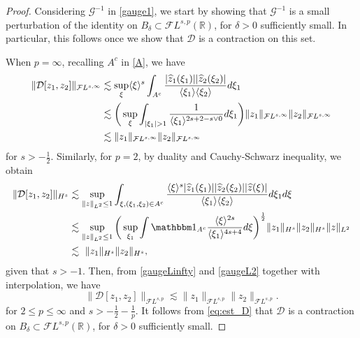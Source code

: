 \documentclass[%
11pt,  reqno]{amsart}
\newcommand{\jap}[1]{\langle #1 \rangle}
\newcommand{\5}{\textup{V}}
\newcommand{\FL}{\mathcal{F} L}
\newcommand{\ind}{\mathbbm 1}
\newcommand{\les}{\lesssim}
\newcommand{\dl}{\delta}
\theoremstyle{remark}
\newtheorem{remark}[theorem]{Remark}
\newcommand{\R}{\mathbb{R}}
\newcommand{\jb}[1]
{\langle #1 \rangle}
\newcommand{\Gc}{\mathcal{G}}
\numberwithin{equation}{section}
\numberwithin{theorem}{section}
\newcommand{\D}{\mathrm{D}}
\newcommand{\DD}{\mathcal{D}}
\begin{document}

\begin{proof}

Considering $\Gc^{-1}$ in \eqref{gauge1}, we start by showing that $\Gc^{-1}$ is a small perturbation of the identity on $B_\dl \subset  \FL^{s, p}(\R)$, for $\dl>0$ sufficiently small. In particular, this follows once we show that $\DD$ is a contraction on this set. 

When $p=\infty$, recalling $A^c$ in \eqref{A}, we have
\begin{align}
\|\DD[z_{1},z_{2}]\|_{\mathcal{F}L^{s,\infty}}   
&
\les
\sup_\xi \jb{\xi}^s \int_{A^c} 
\frac{|\widehat{z}_{1}(\xi_{1})||\widehat{z}_{2}(\xi_{2})|}{\jap{\xi_{1}}\jap{\xi_{2}}} d\xi_{1} 
\notag
\\
&\les
\bigg( \sup_{\xi} \int_{|\xi_{1}|>1} \frac{1}{\jap{\xi_{1}}^{2s+2 - s\lor 0 }} d\xi_{1} 
\bigg) 
\|z_{1}\|_{\mathcal{F}L^{s,\infty}}\|z_{2}\|_{ \mathcal{F}L^{s,\infty}}
\notag
\\
& \les
\|z_{1}\|_{ \mathcal{F}L^{s,\infty}}
\|z_{2}\|_{ \mathcal{F}L^{s,\infty}}
\label{gaugeLinfty}
\end{align}
for $s>-\frac12$.
Similarly, for $p=2$, by duality and Cauchy-Schwarz inequality, we obtain
\begin{align}
\|\DD[z_{1},z_{2}]\|_{H^s}   
&
\les 
\sup_{\|z\|_{L^2} \le 1 }
	 \int_{\xi, (\xi_1,\xi_2)\in A^c} \frac{\jap{\xi}^s|\widehat{z}_{1}(\xi_{1})||\widehat{z}_{2}(\xi_{2})||\widehat{z}(\xi)|}{\jap{\xi_{1}}\jap{\xi_{2}}} d\xi_{1}d\xi 
     \notag
    \\
    & \les \sup_{\|z\|_{L^2 } \le 1}  \bigg( \sup_{\xi_{1}}  \int \ind_{A^c} \frac{\jap{\xi}^{2s}}{\jap{\xi_{1}}^{4s+4}}d\xi \bigg)^{\frac{1}{2}}
\|z_{1}\|_{H^s}\|z_{2}\|_{H^s}\|z\|_{L^2}
\notag
\\
&
\lesssim\  \|z_{1}\|_{H^s}\|z_{2}\|_{ H^s}, 
\label{gaugeL2}
\end{align}
given that $s>-1$. 
Then, from \eqref{gaugeLinfty} and \eqref{gaugeL2} together with interpolation, we have
\begin{equation}\label{eq:est_D}
		\|\DD[z_{1},z_{2}]\|_{ \mathcal{F}L^{s,p}}
        \les
\|z_{1}\|_{ \mathcal{F}L^{s,p}}\|z_{2}\|_{ \mathcal{F}L^{s,p}}. 
\end{equation}
for $2 \le p \le \infty$ and $s> -\frac12 - \frac1p$.
It follows from \eqref{eq:est_D} that $\DD$ is a contraction on $B_\dl \subset \FL^{s,p}(\R)$, for $\dl>0$ sufficiently small.





\end{proof}
\end{document}
